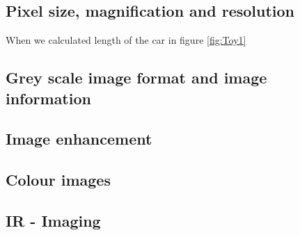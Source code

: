 \subsection{Pixel size, magnification and resolution}
When we calculated length of the car in figure \ref{fig:Toy1}

\subsection{Grey scale image format and image information}
\subsection{Image enhancement}
\subsection{Colour images}
\subsection{IR - Imaging}




